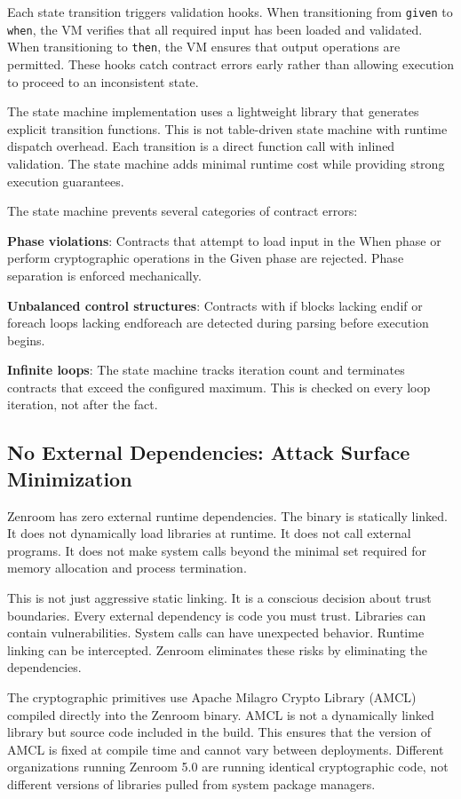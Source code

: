 Each state transition triggers validation hooks. When transitioning
from \texttt{given} to \texttt{when}, the VM verifies that all
required input has been loaded and validated. When transitioning to
\texttt{then}, the VM ensures that output operations are
permitted. These hooks catch contract errors early rather than
allowing execution to proceed to an inconsistent state.

The state machine implementation uses a lightweight library that
generates explicit transition functions. This is not table-driven
state machine with runtime dispatch overhead. Each transition is a
direct function call with inlined validation. The state machine adds
minimal runtime cost while providing strong execution guarantees.

The state machine prevents several categories of contract errors:

\textbf{Phase violations}: Contracts that attempt to load input in the
When phase or perform cryptographic operations in the Given phase are
rejected. Phase separation is enforced mechanically.

\textbf{Unbalanced control structures}: Contracts with if blocks
lacking endif or foreach loops lacking endforeach are detected during
parsing before execution begins.

\textbf{Infinite loops}: The state machine tracks iteration count and
terminates contracts that exceed the configured maximum. This is
checked on every loop iteration, not after the fact.

\subsection{No External Dependencies: Attack Surface Minimization}

Zenroom has zero external runtime dependencies. The binary is
statically linked. It does not dynamically load libraries at
runtime. It does not call external programs. It does not make system
calls beyond the minimal set required for memory allocation and
process termination.

This is not just aggressive static linking. It is a conscious decision
about trust boundaries. Every external dependency is code you must
trust. Libraries can contain vulnerabilities. System calls can have
unexpected behavior. Runtime linking can be intercepted. Zenroom
eliminates these risks by eliminating the dependencies.

The cryptographic primitives use Apache Milagro Crypto Library (AMCL)
compiled directly into the Zenroom binary. AMCL is not a dynamically
linked library but source code included in the build. This ensures
that the version of AMCL is fixed at compile time and cannot vary
between deployments. Different organizations running Zenroom 5.0 are
running identical cryptographic code, not different versions of
libraries pulled from system package managers.

